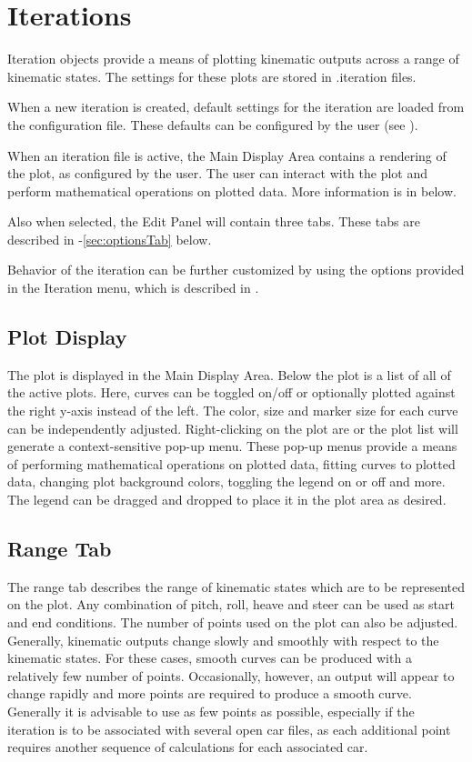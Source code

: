 \chapter{Iterations} \label{ch:iterations}

Iteration objects provide a means of plotting kinematic outputs across a range of kinematic states.  The settings for these plots are stored in .iteration files.

When a new iteration is created, default settings for the iteration are loaded from the configuration file.  These defaults can be configured by the user (see ).

When an iteration file is active, the Main Display Area contains a rendering of the plot, as configured by the user.  The user can interact with the plot and perform mathematical operations on plotted data.  More information is in  below.

Also when selected, the Edit Panel will contain three tabs.  These tabs are described in -\ref{sec:optionsTab} below.

Behavior of the iteration can be further customized by using the options provided in the Iteration menu, which is described in .

\section{Plot Display} \label{sec:plotDisplay}

The plot is displayed in the Main Display Area.  Below the plot is a list of all of the active plots.  Here, curves can be toggled on/off or optionally plotted against the right y-axis instead of the left.  The color, size and marker size for each curve can be independently adjusted.  Right-clicking on the plot are or the plot list will generate a context-sensitive pop-up menu.  These pop-up menus provide a means of performing mathematical operations on plotted data, fitting curves to plotted data, changing plot background colors, toggling the legend on or off and more.  The legend can be dragged and dropped to place it in the plot area as desired.

\section{Range Tab} \label{sec:rangeTab}

The range tab describes the range of kinematic states which are to be represented on the plot.  Any combination of pitch, roll, heave and steer can be used as start and end conditions.  The number of points used on the plot can also be adjusted.  Generally, kinematic outputs change slowly and smoothly with respect to the kinematic states.  For these cases, smooth curves can be produced with a relatively few number of points.  Occasionally, however, an output will appear to change rapidly and more points are required to produce a smooth curve.  Generally it is advisable to use as few points as possible, especially if the iteration is to be associated with several open car files, as each additional point requires another sequence of calculations for each associated car.

